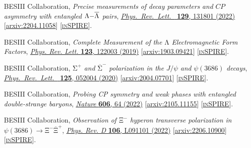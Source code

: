 \documentclass[a4paper,11pt]{article}
\begin{document}
\begin{thebibliography}{**}
 BESIII Collaboration,
\textit{Precise measurements of decay parameters and $CP$ asymmetry with entangled $\mathrm{\ensuremath{\Lambda}}\text{\ensuremath{-}}\overline{\mathrm{\ensuremath{\Lambda}}}$ pairs}, \href{https://journals.aps.org/prl/abstract/10.1103/PhysRevLett.129.131801}{\textit{Phys.\ Rev.\ Lett.\ } \textbf{129}, 131801 (2022)}
[\textcolor{blue}{\href{https://arxiv.org/pdf/2204.11058.pdf}{arxiv:2204.11058}}] 
[\textcolor{blue}{\href{https://inspirehep.net/literature/2071715}{\textsc{inSPIRE}}}].

 BESIII Collaboration,
\textit{Complete Measurement of the $\mathrm{\ensuremath{\Lambda}}$ Electromagnetic Form Factors}, \href{https://journals.aps.org/prl/abstract/10.1103/PhysRevLett.123.122003}{\textit{Phys. Rev. Lett.} \textbf{123}, 122003 (2019)}
[\textcolor{blue}{\href{https://arxiv.org/pdf/1903.09421.pdf}{arxiv:1903.09421}}] 
[\textcolor{blue}{\href{https://inspirehep.net/literature/1726357}{\textsc{inSPIRE}}}].

 BESIII Collaboration, 
\textit{${\mathrm{\ensuremath{\Sigma}}}^{+}$ and ${\overline{\mathrm{\ensuremath{\Sigma}}}}^{\ensuremath{-}}$ polarization in the $J/\ensuremath{\psi}$ and $\ensuremath{\psi}(3686)$ decays}, 
\href{https://journals.aps.org/prl/abstract/10.1103/PhysRevLett.125.052004}{\textit{Phys.\ Rev.\ Lett.\ }  {\bf 125}, 052004 (2020)}
[\textcolor{blue}{\href{https://arxiv.org/pdf/2004.07701.pdf}{arxiv:2004.07701}}] 
[\textcolor{blue}{\href{https://inspirehep.net/literature/1791570}{\textsc{inSPIRE}}}].

 BESIII Collaboration,
\textit{Probing CP symmetry and weak phases with entangled double-strange baryons}, \href{https://www.nature.com/articles/s41586-022-04624-1#citeas}{\textit{Nature }\textbf{606}, 64 (2022)}
[\textcolor{blue}{\href{https://arxiv.org/pdf/2105.11155.pdf}{arxiv:2105.11155}}] 
[\textcolor{blue}{\href{https://inspirehep.net/literature/1864775}{\textsc{inSPIRE}}}].

  BESIII Collaboration,
 \textit{Observation of ${\mathrm{\ensuremath{\Xi}}}^{\ensuremath{-}}$ hyperon transverse polarization in $\ensuremath{\psi}(3686)\ensuremath{\rightarrow}{\mathrm{\ensuremath{\Xi}}}^{\ensuremath{-}}{\overline{\mathrm{\ensuremath{\Xi}}}}^{+}$}, \href{https://journals.aps.org/prd/abstract/10.1103/PhysRevD.106.L091101}{\textit{Phys. Rev. D} \textbf{106},  L091101 (2022)}
[\textcolor{blue}{\href{https://arxiv.org/pdf/2206.10900.pdf}{arxiv:2206.10900}}] 
[\textcolor{blue}{\href{https://inspirehep.net/literature/2099144}{\textsc{inSPIRE}}}]. 
 

\end{thebibliography}
\end{document}
